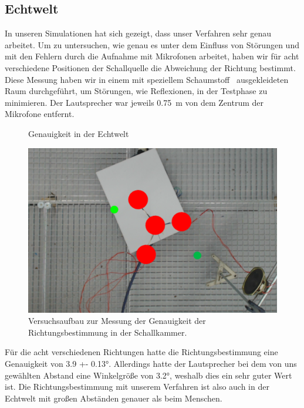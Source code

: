 \subsection{Echtwelt}
In unseren Simulationen hat sich gezeigt, dass unser Verfahren sehr genau arbeitet. Um zu untersuchen, wie genau es unter dem Einfluss von Störungen und mit den Fehlern durch die Aufnahme mit Mikrofonen arbeitet, haben wir für acht verschiedene Positionen der Schallquelle die Abweichung der Richtung bestimmt. Diese Messung haben wir in einem mit speziellem Schaumstoff~\cite{BASOTECT} ausgekleideten Raum durchgeführt, um Störungen, wie Reflexionen, in der Testphase zu minimieren. Der Lautsprecher war jeweils \SI{0.75}{\meter} von dem Zentrum der Mikrofone entfernt.
\begin{figure}[H]
\begin{minipage}[b]{0.675\textwidth}
  \centering
  \resizebox{!}{0.675\textwidth}{}
  \caption{Genauigkeit in der Echtwelt\label{fig:real}}
\end{minipage}
\hfill
\begin{minipage}[b]{0.3\textwidth}
  \centering
  \includegraphics[width=\textwidth]{img/pos_1}
  \caption{Versuchsaufbau zur Messung der Genauigkeit der Richtungsbestimmung in der Schallkammer.\label{fig:real_reral}}
\end{minipage}
\end{figure}
Für die acht verschiedenen Richtungen hatte die Richtungsbestimmung eine Genauigkeit von \ang[separate-uncertainty = true]{3.9 +- 0.13}. Allerdings hatte der Lautsprecher bei dem von uns gewählten Abstand eine Winkelgröße von \ang{3.2}, weshalb dies ein sehr guter Wert ist. Die Richtungsbestimmung mit unserem Verfahren ist also auch in der Echtwelt mit großen Abständen genauer als beim Menschen.

